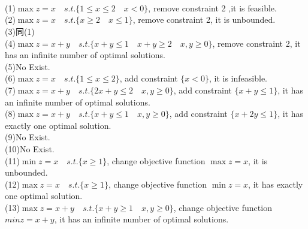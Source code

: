 \documentclass[12pt]{article}
\begin{document}
\section{}
\quad \\
(1)$\max z=x \quad  s.t.\{ 1 \leqslant x \leqslant 2 \quad x < 0\}$, remove constraint 2 ,it is feasible.\\
(2)$\max z=x \quad s.t.\{ x \geqslant 2 \quad x \leqslant 1\}$, remove constraint 2, it is unbounded.\\
(3)同(1)\\
(4)$\max z=x+y \quad s.t.\{x+y \leqslant 1 \quad x+y \geqslant 2 \quad x,y \geqslant 0\}$, remove constraint 2, it has an infinite number of optimal solutions.\\
(5)No Exist.\\
(6)$\max z=x \quad  s.t.\{ 1 \leqslant x \leqslant 2 \}$, add constraint $\{x<0\}$, it is infeasible.\\
(7)$\max z=x+y \quad s.t.\{2x+y \leqslant 2 \quad x,y \geqslant 0\}$, add constraint $\{x+y \leqslant 1\}$, it has an infinite number of optimal solutions.\\
(8)$\max z=x+y \quad s.t.\{x+y \leqslant 1 \quad x,y \geqslant 0\}$, add constraint $\{x+2y \leqslant 1\}$, it has exactly one optimal solution.\\
(9)No Exist.\\
(10)No Exist.\\
(11)$\min z=x \quad s.t.\{x \geqslant 1\}$, change objective function $\max z=x$, it is unbounded.\\
(12)$\max z=x \quad s.t.\{x \geqslant 1\}$, change objective function $\min z=x$, it has exactly one optimal solution.\\
(13)$\max z=x+y \quad s.t.\{x+y \geqslant 1 \quad x,y \geqslant 0\}$, change objective function $min z=x+y$, it has an infinite number of optimal solutions.\\
\end{document}
